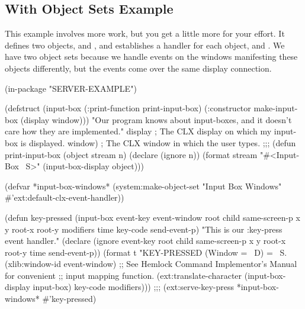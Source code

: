 \subsection{With Object Sets Example}

This example involves more work, but you get a little more for your effort.  It
defines two objects,  and , and establishes a
 handler for each object,  and
.  We have two object sets because we handle events on the
windows manifesting these objects differently, but the events come over the
same display connection.

\begin{lisp}
(in-package "SERVER-EXAMPLE")

(defstruct (input-box (:print-function print-input-box)
                      (:constructor make-input-box (display window)))
  "Our program knows about input-boxes, and it doesn't care how they
   are implemented."
  display        ; The CLX display on which my input-box is displayed.
  window)        ; The CLX window in which the user types.
;;;
(defun print-input-box (object stream n)
  (declare (ignore n))
  (format stream "#<Input-Box ~S>" (input-box-display object)))

(defvar *input-box-windows*
        (system:make-object-set "Input Box Windows"
                                #'ext:default-clx-event-handler))

(defun key-pressed (input-box event-key event-window root child
                    same-screen-p x y root-x root-y modifiers time
                    key-code send-event-p)
  "This is our :key-press event handler."
  (declare (ignore event-key root child same-screen-p x y
                   root-x root-y time send-event-p))
  (format t "KEY-PRESSED (Window = ~D) = ~S.~%
          (xlib:window-id event-window)
          ;; See Hemlock Command Implementor's Manual for convenient
          ;; input mapping function.
          (ext:translate-character (input-box-display input-box)
                                     key-code modifiers)))
;;;
(ext:serve-key-press *input-box-windows* #'key-pressed)
\end{lisp}

